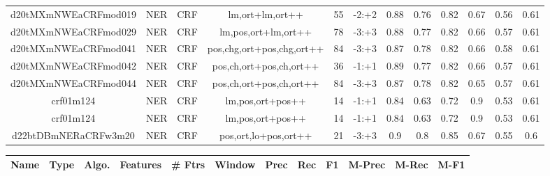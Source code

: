 \documentclass[a4paper]{article}
\begin{document}
\begin{landscape}
\begin{center}
\begin{tabular}{ |c|c|c|c|c|c|c|c|c|c|c|c|}
 
 	
 	\small{ d20tMXmNWEaCRFmod019 } & \small{ NER} & \small{  CRF }  & lm,ort+lm,ort++  &  55 &  \small{  -2:+2 }  &  0.88 & 0.76 & 0.82  &  0.67 & 0.56 & 0.61 \\
 	

 
 	
 	\small{ d20tMXmNWEaCRFmod029 } & \small{ NER} & \small{  CRF }  & lm,pos,ort+lm,ort++  &  78 &  \small{  -3:+3 }  &  0.88 & 0.77 & 0.82  &  0.66 & 0.57 & 0.61 \\
 	

 
 	
 	\small{ d20tMXmNWEaCRFmod041 } & \small{ NER} & \small{  CRF }  & pos,chg,ort+pos,chg,ort++  &  84 &  \small{  -3:+3 }  &  0.87 & 0.78 & 0.82  &  0.66 & 0.58 & 0.61 \\
 	

 
 	
 	\small{ d20tMXmNWEaCRFmod042 } & \small{ NER} & \small{  CRF }  & pos,ch,ort+pos,ch,ort++  &  36 &  \small{  -1:+1 }  &  0.89 & 0.77 & 0.82  &  0.66 & 0.57 & 0.61 \\
 	

 
 	
 	\small{ d20tMXmNWEaCRFmod044 } & \small{ NER} & \small{  CRF }  & pos,ch,ort+pos,ch,ort++  &  84 &  \small{  -3:+3 }  &  0.87 & 0.78 & 0.82  &  0.65 & 0.57 & 0.61 \\
 	

 
 	
 	\small{ crf01m124 } & \small{ NER} & \small{  CRF }  & lm,pos,ort+pos++  &  14 &  \small{  -1:+1 }  &  0.84 & 0.63 & 0.72  &  0.9 & 0.53 & 0.61 \\
 	

 
 	
 	\small{ crf01m124 } & \small{ NER} & \small{  CRF }  & lm,pos,ort+pos++  &  14 &  \small{  -1:+1 }  &  0.84 & 0.63 & 0.72  &  0.9 & 0.53 & 0.61 \\
 	

 
 	
 	\small{ d22btDBmNERaCRFw3m20 } & \small{ NER} & \small{  CRF }  & pos,ort,lo+pos,ort++  &  21 &  \small{  -3:+3 }  &  0.9 & 0.8 & 0.85  &  0.67 & 0.55 & 0.6 \\
 	
 \hline
\end{tabular}
\end{center}




\begin{center}
\begin{tabular}{ |c|c|c|c|c|c|c|c|c|c|c|c|} 
 \hline
 	Name & Type & Algo. & Features & \# Ftrs & Window & Prec & Rec & F1 & M-Prec & M-Rec & M-F1\\
 \hline


\end{tabular}
\end{center}
\end{landscape}
\end{document}
